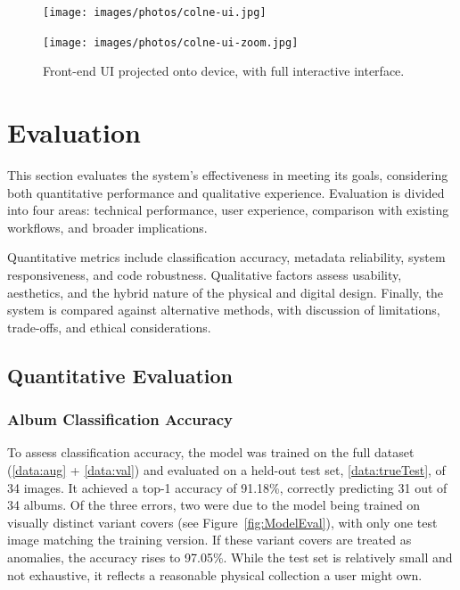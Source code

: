             \begin{figure}[h]
                \centering
                \begin{minipage}[b]{0.45\textwidth}
                    \centering
                    \texttt{[image: images/photos/colne-ui.jpg]}
                \end{minipage}
                \hfill
                \begin{minipage}[b]{0.45\textwidth}
                    \centering
                    \texttt{[image: images/photos/colne-ui-zoom.jpg]}
                \end{minipage}
                \caption{Front-end UI projected onto device, with full interactive interface.}
                \label{fig:colne}
            \end{figure}
    
    \section{Evaluation} \label{sec:evaluation}
    
        This section evaluates the system’s effectiveness in meeting its goals, considering both quantitative performance and qualitative experience. Evaluation is divided into four areas: technical performance, user experience, comparison with existing workflows, and broader implications.
    
        Quantitative metrics include classification accuracy, metadata reliability, system responsiveness, and code robustness. Qualitative factors assess usability, aesthetics, and the hybrid nature of the physical and digital design. Finally, the system is compared against alternative methods, with discussion of limitations, trade-offs, and ethical considerations.
        
        \subsection{Quantitative Evaluation}
    
            \subsubsection{Album Classification Accuracy}
    
                To assess classification accuracy, the model was trained on the full dataset (\ref{data:aug} + \ref{data:val}) and evaluated on a held-out test set, \ref{data:trueTest}, of 34 images. It achieved a top-1 accuracy of 91.18\%, correctly predicting 31 out of 34 albums. Of the three errors, two were due to the model being trained on visually distinct variant covers (see Figure~\ref{fig:ModelEval}), with only one test image matching the training version. If these variant covers are treated as anomalies, the accuracy rises to 97.05\%. While the test set is relatively small and not exhaustive, it reflects a reasonable physical collection a user might own.
    
